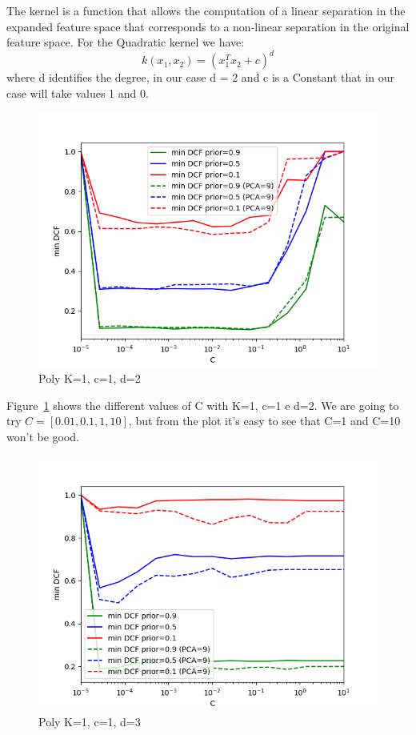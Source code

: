\documentclass[english]{report}
\begin{document}
The kernel is a function that allows the computation of a linear separation in the expanded feature
space that corresponds to a non-linear separation in the original feature space.
For the Quadratic kernel we have:
\[k(x_1,x_2) = (x_1^Tx_2 + c)^d\]
where d identifies the degree, in our case d = 2 and c is a Constant that in our case will take values
1 and 0.

\begin{figure}[h!]
    \includegraphics[scale = 0.5]{../../images/validation/SVM_Poly_minDCF_comparison_K=1_c=1_d=2}
    \centering
    \caption{Poly K=1, c=1, d=2}
    \label{fig:PolySVM_d2_valid}
\end{figure}

Figure~\ref{fig:PolySVM_d2_valid} shows the different values of C with K=1, c=1 e d=2.
We are going to try \(C = [0.01,0.1,1,10]\), but from the plot it's easy to see that C=1 and C=10 won't be good.

\begin{figure}[h!]
    \includegraphics[scale = 0.5]{../../images/validation/SVM_Poly_minDCF_comparison_K=1_c=1_d=3}
    \centering
    \caption{Poly K=1, c=1, d=3}
    \label{fig:PolySVM_d3_valid}
\end{figure}
\end{document}
